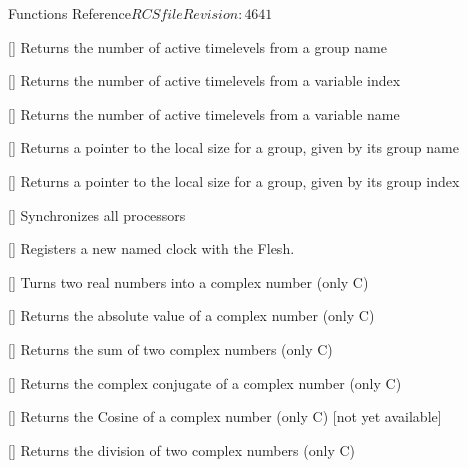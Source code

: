 \begin{cactuspart}{ Functions Reference}{$RCSfile$}{$Revision: 4641 $}
\begin{Lentry}
\item[\code{CCTK\_ActiveTimeLevelsGN}] [\pageref{CCTK-ActiveTimeLevels}]
  Returns the number of active timelevels from a group name

\item[\code{CCTK\_ActiveTimeLevelsVI}] [\pageref{CCTK-ActiveTimeLevels}]
  Returns the number of active timelevels from a variable index

\item[\code{CCTK\_ActiveTimeLevelsVN}] [\pageref{CCTK-ActiveTimeLevels}]
  Returns the number of active timelevels from a variable name

\item[\code{CCTK\_ArrayGroupSize}] [\pageref{CCTK-ArrayGroupSize}]
  Returns a pointer to the local size for a group, given by its group name

\item[\code{CCTK\_ArrayGroupSizeI}] [\pageref{CCTK-ArrayGroupSizeI}]
  Returns a pointer to the local size for a group, given by its group index

\item[\code{CCTK\_Barrier}] [\pageref{CCTK-Barrier}]
  Synchronizes all processors

\item[\code{CCTK\_ClockRegister}] [\pageref{CCTK-ClockRegister}]
  Registers a new named clock with the Flesh.

\item[\code{CCTK\_Cmplx}] [\pageref{CCTK-Cmplx}]
  Turns two real numbers into a complex number (only C)

\item[\code{CCTK\_CmplxAbs}] [\pageref{CCTK-CmplxAbs}]
  Returns the absolute value of a complex number (only C)

\item[\code{CCTK\_CmplxAdd}] [\pageref{CCTK-CmplxAdd}]
  Returns the sum of two complex numbers (only C)

\item[\code{CCTK\_CmplxConjg}] [\pageref{CCTK-CmplxConjg}]
  Returns the complex conjugate of a complex number (only C)

\item[\code{CCTK\_CmplxCos}] [\pageref{CCTK-CmplxCos}]
  Returns the Cosine of a complex number (only C) [not yet available]

\item[\code{CCTK\_CmplxDiv}] [\pageref{CCTK-CmplxDiv}]
  Returns the division of two complex numbers (only C)


\end{Lentry}
\end{cactuspart}
